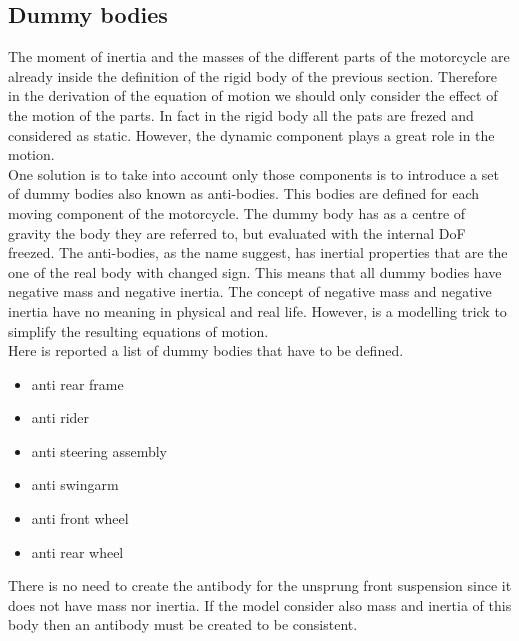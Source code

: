 \subsection{Dummy bodies}
%
The moment of inertia and the masses of the different parts of the motorcycle are already inside the definition of the rigid body of the previous section. Therefore in the derivation of the equation of motion we should only consider the effect of the motion of the parts. In fact in the rigid body all the pats are frezed and considered as static. However, the dynamic component plays a great role in the motion.\\ 
One solution is to take into account only those components is to introduce a set of dummy bodies also known as anti-bodies. This bodies are defined for each moving component of the motorcycle. The dummy body has as a centre of gravity the body they are referred to, but evaluated with the internal DoF freezed. The anti-bodies, as the name suggest, has inertial properties that are the one of the real body with changed sign. This means that all dummy bodies have negative mass and negative inertia. 
The concept of negative mass and negative inertia have no meaning in physical and real life. However, is a modelling trick to simplify the resulting equations of motion.\\
Here is reported a list of dummy bodies that have to be defined.
%
\begin{itemize}
    \setlength{\itemsep}{0pt}
    \item anti rear frame
    \item anti rider 
    \item anti steering assembly
    \item anti swingarm 
    \item anti front wheel
    \item anti rear wheel
\end{itemize}
%
There is no need to create the antibody for the unsprung front suspension since it does not have mass nor inertia. If the model consider also mass and inertia of this body then an antibody must be created to be consistent.
%
